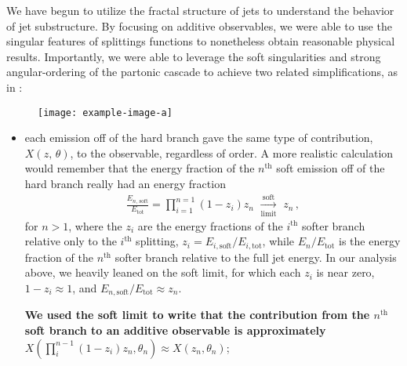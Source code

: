 We have begun to utilize the fractal structure of jets to understand the behavior of jet substructure.
%
By focusing on additive observables, we were able to use the singular features of splittings functions to nonetheless obtain reasonable physical results.
%
Importantly, we were able to leverage the soft singularities and strong angular-ordering of the partonic cascade to achieve two related simplifications, as in :

\begin{figure}[t]
    \centering
    \texttt{[image: example-image-a]}
    \caption{}
    \label{fig:cascade-simplifications}
\end{figure}

\begin{itemize}
     \item
        each emission off of the hard branch gave the same type of contribution, \(X(z,\,\theta)\), to the observable, regardless of order.
        A more realistic calculation would remember that the energy fraction of the \(n^\text{th}\) soft emission off of the hard branch really had an energy fraction
        \begin{align}
            \frac{E_{n,\,\text{soft}}}{E_\text{tot}}
            =
            \prod_{i = 1}^{n=1}
            (1-z_i)
            z_n
            \,\,
            \xrightarrow[\text{limit}]{\text{soft}}
            \,\,
            z_n
            \,,
        \end{align}
        for \(n > 1\), where the \(z_i\) are the energy fractions of the \(i^\text{th}\) softer branch relative only to the \(i^\text{th}\) splitting, \(z_i = E_{i,\text{soft}}/E_{i,\text{tot}}\), while \(E_n/E_\text{tot}\) is the energy fraction of the \(n^\text{th}\) softer branch relative to the full jet energy.
        In our analysis above, we heavily leaned on the soft limit, for which each \(z_i\) is near zero, \(1-z_i \approx 1\), and \(E_{n,\text{soft}}/E_\text{tot} \approx z_n\).

        \textbf{We used the soft limit to write that the contribution from the \(n^\text{th}\) soft branch to an additive observable is approximately} \(X(\prod_{i}^{n-1} (1-z_i) z_n, \theta_n) \approx X(z_n, \theta_n)\);



\end{itemize}
